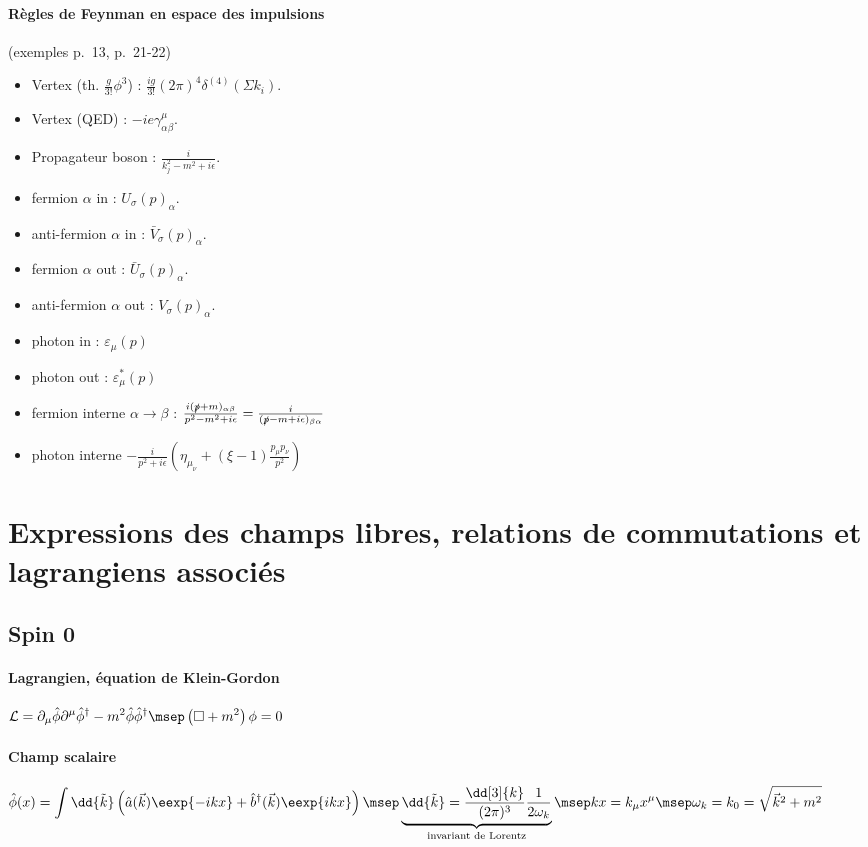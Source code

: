 \documentclass{article}
\begin{document}
\paragraph{Règles de Feynman en espace des impulsions}(exemples p.~13, p.~21-22)
\begin{itemize}
\item Vertex (th. $\frac{g}{3!}\phi^3$) : $\frac{ig}{3!} (2\pi)^4\delta^{(4)}(\Sigma k_i)$.
\item Vertex (QED) : $-ie\gamma^\mu_{\alpha\beta}$.
\item Propagateur boson : $\frac{i}{k_j^2-m^2+i\epsilon}$.
\item fermion $\alpha$ in : $U_\sigma(p)_\alpha$.
\item anti-fermion $\alpha$ in : $\bar{V}_\sigma(p)_\alpha$.
\item fermion $\alpha$ out : $\bar{U}_\sigma(p)_\alpha$.
\item anti-fermion $\alpha$ out : $V_\sigma(p)_\alpha$.
\item photon in : $\varepsilon_\mu(p)$
\item photon out : $\varepsilon^*_\mu(p)$
\item fermion interne $\alpha\rightarrow\beta$ : $\frac{i(\slashed{p}+m)_{\alpha\beta}}{p^2-m^2+i\epsilon}=\frac{i}{(\slashed{p}-m+i\epsilon)_{\beta\alpha}}$
\item photon interne $-\frac{i}{p^2+i\epsilon}\left( \eta_{\mu_\nu} + (\xi-1)\frac{p_\mu p_\nu}{p^2} \right)$
\end{itemize}

\section{Expressions des champs libres, relations de commutations et lagrangiens associés}

\subsection{Spin 0}
\paragraph{Lagrangien, équation de Klein-Gordon}$\displaystyle
\mathcal{L} = \partial_\mu\hat{\phi}\partial^\mu\hat{\phi}^\dagger - m^2 \hat{\phi}\hat{\phi}^\dagger
\msep
\left(\square + m^2\right)\phi=0
$
\paragraph{Champ scalaire}$\displaystyle
\hat{\phi}(x) = \int \dd{\tilde{k}}\left( \hat{a}(\vec{k})\eexp{-ikx}+\hat{b}^\dagger(\vec{k})\eexp{ikx} \right)
\msep
\underbrace{\dd{\tilde{k}} = \frac{\dd[3]{k}}{(2\pi)^3}\frac{1}{2\omega_k}}_\text{invariant de Lorentz}
\msep
kx = k_\mu x^\mu
\msep
\omega_k = k_0 = \sqrt{\vec{k}^2+m^2}
$
\end{document}
